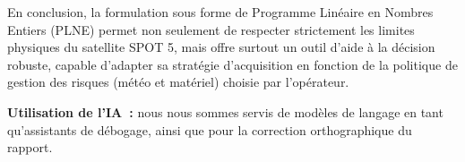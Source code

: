 \documentclass[8pt]{article}
\begin{document}
En conclusion, la formulation sous forme de Programme Linéaire en Nombres Entiers (PLNE) permet non seulement de respecter strictement les limites physiques du satellite SPOT 5, mais offre surtout un outil d'aide à la décision robuste, capable d'adapter sa stratégie d'acquisition en fonction de la politique de gestion des risques (météo et matériel) choisie par l'opérateur.





\vspace{200}


\textbf{Utilisation de l'IA~:} nous nous sommes servis de modèles de langage en tant qu'assistants de débogage, ainsi que pour la correction orthographique du rapport.
\end{document}
